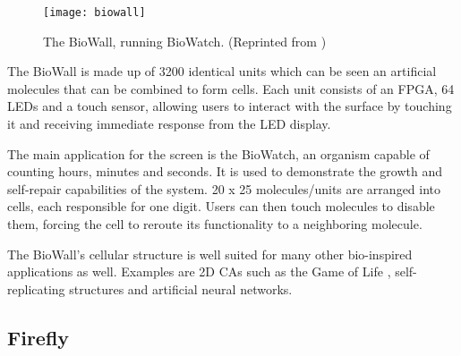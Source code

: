 \begin{figure}[!ht]
    \centering
    \texttt{[image: biowall]}
    \caption[BioWall]{
        The BioWall, running BioWatch.
        (Reprinted from \cite{biowalloverview})
    }
    \label{fig:biowall}
\end{figure}

The BioWall is made up of 3200 identical units which can be seen an artificial molecules that can be combined to form cells.
Each unit consists of an FPGA, 64 LEDs and a touch sensor, allowing users to interact with the surface by touching it and receiving immediate response from the LED display.

The main application for the screen is the BioWatch, an organism capable of counting hours, minutes and seconds.
It is used to demonstrate the growth and self-repair capabilities of the system.
20 x 25 molecules/units are arranged into cells, each responsible for one digit.
Users can then touch molecules to disable them, forcing the cell to reroute its functionality to a neighboring molecule.

The BioWall's cellular structure is well suited for many other bio-inspired applications as well.
Examples are 2D CAs such as the Game of Life \cite{gardner1970life}, self-replicating structures and artificial neural networks.

\subsection{Firefly}

